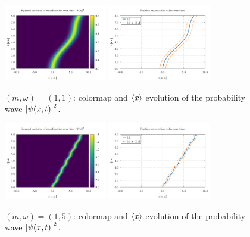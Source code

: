 \documentclass[pra, onecolumn, notitlepage, floats, 11pt]{revtex4-1}
\begin{document}
\begin{figure}[!h]
    \centering
    \includegraphics[width=0.40\textwidth]{images/cmap_1_M_1_O.pdf}
    \hspace{1cm}
    \includegraphics[width=0.40\textwidth]{images/expv_1_M_1_O.pdf}
    \caption{\( (m,\omega) = (1,1) \): colormap and \( \expval{x} \) evolution of the probability wave \( \abs{\psi(x,t)}^{2} \).}
    \label{fig:07_R_12}
\end{figure}
\begin{figure}[!h]
    \centering
    \includegraphics[width=0.40\textwidth]{images/cmap_1_M_5_O.pdf}
    \hspace{1cm}
    \includegraphics[width=0.40\textwidth]{images/expv_1_M_5_O.pdf}
    \caption{\( (m,\omega) = (1,5) \): colormap and \( \expval{x} \) evolution of the probability wave \( \abs{\psi(x,t)}^{2} \).}
    \label{fig:07_R_34}
\end{figure}
\end{document}
